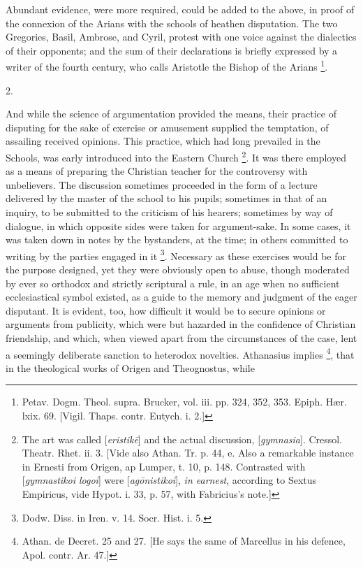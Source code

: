 Abundant evidence, were more required, could be added to the
above, in proof of the connexion of the Arians with the schools of
heathen disputation. The two Gregories, Basil, Ambrose, and Cyril,
protest with one voice against the dialectics of their opponents; and
the sum of their declarations is briefly expressed by a writer of the
fourth century, who calls Aristotle the Bishop of the Arians \footnote{Petav. Dogm. Theol. supra. Brucker, vol. iii. pp. 324, 352,
353. Epiph. Hær. lxix. 69. [Vigil. Thaps. contr. Eutych. i. 2.]}.

2.

And while the science of argumentation provided the means, their
practice of disputing for the sake of exercise or amusement supplied
the temptation, of assailing received opinions. This practice, which
had long prevailed in the Schools, was early introduced into the
Eastern Church \footnote{The art was called [\emph{eristik\={e}}] and the actual
discussion, [\emph{gymnasia}]. Cressol. Theatr. Rhet. ii. 3. [Vide
also Athan. Tr. p. 44, e. Also a remarkable instance in Ernesti from
Origen, ap Lumper, t. 10, p. 148. Contrasted with [\emph{gymnastikoi
logoi}] were [\emph{ag\={o}nistikoi}], \emph{in earnest},
according to Sextus Empiricus, vide Hypot. i. 33, p. 57, with
Fabricius's note.]}. It was there employed as a means of
preparing the Christian teacher for the controversy with unbelievers.
The discussion sometimes proceeded in the form of a lecture delivered
by the master of the school to his pupils; sometimes in that of an
inquiry, to be submitted to the criticism of his hearers; sometimes by
way of dialogue, in which opposite sides were taken for argument-sake.
In some cases, it was taken down in notes by the bystanders, at the
time; in others committed to writing by the parties engaged in it \footnote{Dodw. Diss. in Iren. v. 14. Socr. Hist. i. 5.}. Necessary as these exercises would be for the purpose
designed, yet they were obviously open to abuse, though moderated by
ever so orthodox and strictly scriptural a rule, in an age when no
sufficient ecclesiastical symbol existed, as a guide to the memory and
judgment of the eager disputant. It is evident, too, how difficult it
would be to secure opinions or arguments from publicity, which were
but hazarded in the confidence of Christian friendship, and which,
when viewed apart from the circumstances of the case, lent a seemingly
deliberate sanction to heterodox novelties. Athanasius implies \footnote{Athan. de Decret. 25 and 27. [He says the same of Marcellus in
his defence, Apol. contr. Ar. 47.]}, that in the theological works of Origen and Theognostus, while
